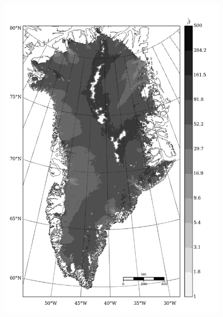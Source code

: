 \begin{figure}
  \centering
  \begin{minipage}[b]{0.47\linewidth}
    \includegraphics[width=1.0\textwidth]{images/greenland/stats/GLM_beta_no_velocity.jpg}
  \end{minipage}
  \quad
  \begin{minipage}[b]{0.47\linewidth}

\end{minipage}
\end{figure}
